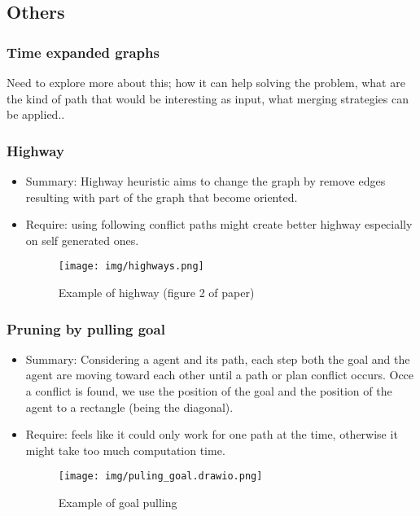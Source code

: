 \documentclass{article}
\theoremstyle{definition}
\newcommand\widthimg{11cm}
\begin{document}
\subsection{Others}
\subsubsection{Time expanded graphs}
Need to explore more about this; how it can help solving the problem, what are the kind of path that would be interesting as input, what merging strategies can be applied..

\subsubsection{Highway}
\begin{itemize}
  \item Summary: Highway\cite{coko16a,courkuxuayko16a} heuristic aims to change the graph by remove edges resulting with part of the graph that become oriented.
  \item Require: using following conflict paths might create better highway especially on self generated\cite{courkuxuayko16a} ones.
  \begin{figure}[H]\label{img:highway}
    \centering
    \caption{Example of highway (figure 2 of paper\cite{coko16a})}
    \texttt{[image: img/highways.png]}
  \end{figure}
\end{itemize}


\subsubsection{Pruning by pulling goal}
\begin{itemize}
  \item Summary: Considering a agent and its path, each step both the goal and the agent are moving toward each other until a path or plan conflict occurs. Occe a conflict is found, we use the position of the goal and the position of the agent to a rectangle (being the diagonal).
  \item Require: feels like it could only work for one path at the time, otherwise it might take too much computation time. 
  \begin{figure}[H]\label{img:pulling_goal}
    \centering
    \caption{Example of goal pulling}
    \texttt{[image: img/puling\_goal.drawio.png]}
  \end{figure}
\end{itemize}
\end{document}
